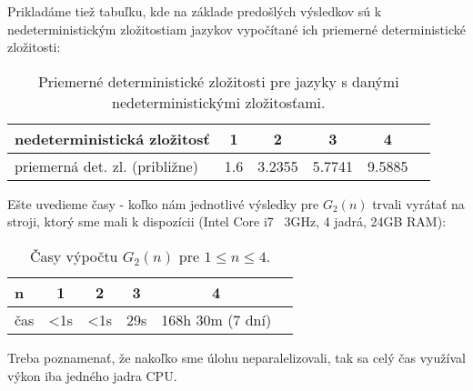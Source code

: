 Prikladáme tiež tabuľku, kde na základe predošlých výsledkov sú k nedeterministickým zložitostiam jazykov vypočítané ich priemerné deterministické zložitosti:

\begin{table}[H]
  \centering
  \begin{tabular}{|l|c|c|c|c|r|}
    \hline
    nedeterministická  zložitosť & 1 & 2 & 3 & 4 \\ 
    \hline
    priemerná det. zl. (približne) & 1.6 & 3.2355 & 5.7741 & 9.5885 \\ 
    \hline
  \end{tabular}
  \caption{Priemerné deterministické zložitosti pre jazyky s danými nedeterministickými zložitosťami.}
\end{table}


Ešte uvedieme časy - koľko nám jednotlivé výsledky pre $G_2(n)$ trvali vyrátať na stroji, ktorý sme mali k dispozícii (Intel Core i7 ~3GHz, 4 jadrá, 24GB RAM):


\begin{table}[H]
  \centering
  \begin{tabular}{|l|c|c|c|c|r|}
    \hline
    n & 1 & 2 & 3 & 4 \\ 
    \hline
    čas & <1s & <1s & 29s & 168h 30m (7 dní) \\ 
    \hline
  \end{tabular}
  \caption{Časy výpočtu $G_2(n)$ pre $1 \leq n \leq 4$.}
\end{table}

Treba poznamenať, že nakoľko sme úlohu neparalelizovali, tak sa celý čas využíval výkon iba jedného jadra CPU.